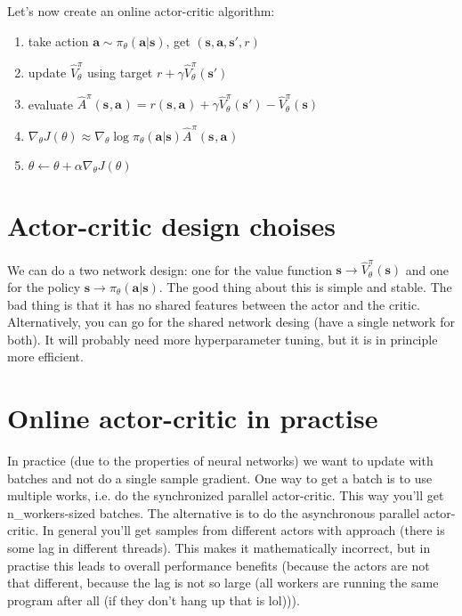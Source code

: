 \documentclass{report}
\begin{document}
Let's now create an online actor-critic algorithm:
\begin{enumerate}
		\item take action $\bm{a} \sim \pi_\theta(\bm{a}|\bm{s})$, get $(\bm{s}, \bm{a},\bm{s'},r)$
		\item update $\hat{V}^\pi_\theta$ using target $r + \gamma \hat{V}^\pi_\theta(\bm{s'})$
		\item evaluate $\hat{A}^\pi(\bm{s}_{}, \bm{a}_{})  = r(\bm{s}_{}, \bm{a}_{}) + \gamma \hat{V}^\pi_\theta(\bm{s'}) - \hat{V}^\pi_\theta(\bm{s})$
		\item $\nabla_\theta J(\theta) \approx \nabla_{\theta} \log \pi_\theta(\bm{a}|\bm{s})\hat{A}^\pi(\bm{s}_{}, \bm{a}_{})$
		\item $\theta \leftarrow \theta  + \alpha \nabla_\theta J(\theta)$
\end{enumerate}

\section{Actor-critic design choises}

We can do a two network design: one for the value function $\bm{s} \to \hat{V}^\pi_\theta(\bm{s})$ and one for the policy 
$\bm{s} \to \pi_\theta(\bm{a}|\bm{s})$.
The good thing about this is simple and stable. The bad thing is that it has no shared features between the actor and the critic.
Alternatively, you can go for the shared network desing (have a single network for both).
It will probably need more hyperparameter tuning, but it is in principle more efficient.

\section{Online actor-critic in practise}
In practice (due to the properties of neural networks) we want to update with batches and not do a single sample gradient.
One way to get a batch is to use multiple works, i.e. do the synchronized parallel actor-critic.
This way you'll get n\_workers-sized batches.
The alternative is to do the asynchronous parallel actor-critic.
In general you'll get samples from different actors with approach (there is some lag in different threads).
This makes it mathematically incorrect, but in practise this leads to overall performance benefits (because the actors are not that different,
because the lag is not so large (all workers are running the same program after all (if they don't hang up that is lol))).
\end{document}
